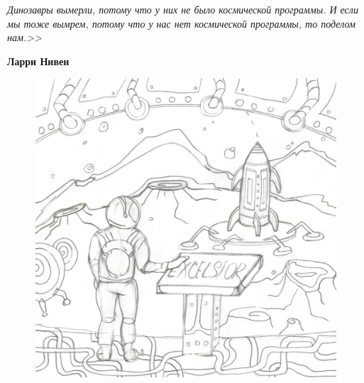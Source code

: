 
\tableofcontents
\newpage

{\Large \textit{Динозавры вымерли, потому что у них не было космической программы. И если мы тоже вымрем, потому что у нас нет космической программы, то поделом нам.>>}}

\hfill \textbf{Ларри Нивен}

\begin{figure}
	\centering
	\includegraphics[width=.8\linewidth]{./img/future}
\end{figure}

\newpage

